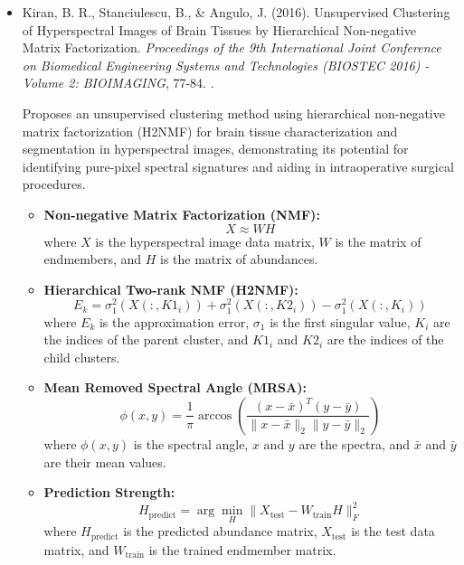 \documentclass[10pt,svgnames,fragile]{beamer}
\begin{document}
\begin{frame}{}
\tiny
\begin{itemize}

    \item Kiran, B. R., Stanciulescu, B., \& Angulo, J. (2016). Unsupervised Clustering of Hyperspectral Images of Brain Tissues by Hierarchical Non-negative Matrix Factorization. \textit{Proceedings of the 9th International Joint Conference on Biomedical Engineering Systems and Technologies (BIOSTEC 2016) - Volume 2: BIOIMAGING}, 77-84. \href{https://doi.org/10.5220/0005697600770084}{\color{blue}{DOI: 10.5220/0005697600770084}}. \cite{kiranUnsupervisedClusteringHyperspectral2016}
    
    {\color{gray}Proposes an unsupervised clustering method using hierarchical non-negative matrix factorization (H2NMF) for brain tissue characterization and segmentation in hyperspectral images, demonstrating its potential for identifying pure-pixel spectral signatures and aiding in intraoperative surgical procedures.}
    \begin{itemize} \tiny
    \item \textbf{Non-negative Matrix Factorization (NMF):}
    \[
    X \approx WH
    \]
    where \( X \) is the hyperspectral image data matrix, \( W \) is the matrix of endmembers, and \( H \) is the matrix of abundances.

    \item \textbf{Hierarchical Two-rank NMF (H2NMF):}
    \[
    E_k = \sigma_1^2(X(:,K1_i)) + \sigma_1^2(X(:,K2_i)) - \sigma_1^2(X(:,K_i))
    \]
    where \( E_k \) is the approximation error, \( \sigma_1 \) is the first singular value, \( K_i \) are the indices of the parent cluster, and \( K1_i \) and \( K2_i \) are the indices of the child clusters.

    \item \textbf{Mean Removed Spectral Angle (MRSA):}
    \[
    \phi(x, y) = \frac{1}{\pi} \arccos \left( \frac{(x - \bar{x})^T (y - \bar{y})}{\| x - \bar{x} \|_2 \| y - \bar{y} \|_2} \right)
    \]
    where \( \phi(x, y) \) is the spectral angle, \( x \) and \( y \) are the spectra, and \( \bar{x} \) and \( \bar{y} \) are their mean values.

    \item \textbf{Prediction Strength:}
    \[
    H_{\text{predict}} = \arg \min_H \| X_{\text{test}} - W_{\text{train}} H \|_F^2
    \]
    where \( H_{\text{predict}} \) is the predicted abundance matrix, \( X_{\text{test}} \) is the test data matrix, and \( W_{\text{train}} \) is the trained endmember matrix.
    \end{itemize}
    
\end{itemize}
\end{frame}
\end{document}
